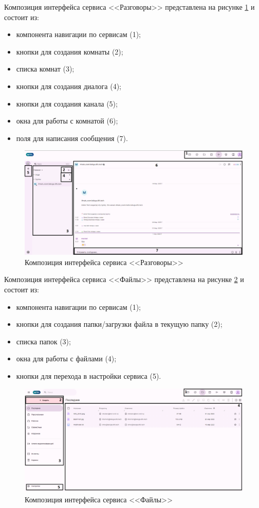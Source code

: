 Композиция интерфейса сервиса <<Разговоры>> представлена на рисунке \ref{templ:image8} и состоит из:
\begin{itemize}
  \item компонента навигации по сервисам (1);
  \item кнопки для создания комнаты (2);
  \item списка комнат (3);
  \item кнопки для создания диалога (4);
  \item кнопки для создания канала (5);
  \item окна для работы с комнатой (6);
  \item поля для написания сообщения (7).
\end{itemize}
\begin{figure}[H]
	\centering
	\includegraphics[width=1\linewidth]{images/разговоры}
	\caption{Композиция интерфейса сервиса <<Разговоры>>}
	\label{templ:image8}
\end{figure}

Композиция интерфейса сервиса <<Файлы>> представлена на рисунке \ref{templ:image9} и состоит из:
\begin{itemize}
  \item компонента навигации по сервисам (1);
  \item кнопки для создания папки/загрузки файла в текущую папку (2);
  \item списка папок (3);
  \item окна для работы с файлами (4);
  \item кнопки для перехода в настройки сервиса (5).
\end{itemize}
\begin{figure}[H]
	\centering
	\includegraphics[width=1\linewidth]{images/файлы}
	\caption{Композиция интерфейса сервиса <<Файлы>>}
	\label{templ:image9}
\end{figure}

